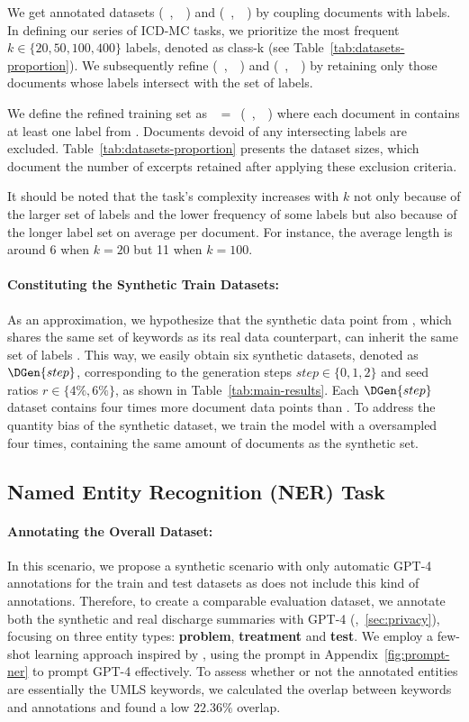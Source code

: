 We get annotated datasets (~\dtr,~\ltr~) and (~\dte,~\lte~) by coupling documents with labels. In defining our series of ICD-MC tasks, we prioritize the most frequent $k \in \{20,50,100,400\}$ labels, denoted as class-k (see Table~\ref{tab:datasets-proportion}). We subsequently refine  (~\dtr,~\ltr~) and (~\dte,~\lte~) by retaining only those documents whose labels intersect with the set of  labels.

We define the refined training set as \dgold~$=$~(~\dptr,~\lptr~) where each document in \dptr contains at least one label from . Documents devoid of any intersecting labels are excluded. Table~\ref{tab:datasets-proportion} presents the dataset sizes, which document the number of excerpts retained after applying these exclusion criteria.

It should be noted that the task's complexity increases with $k$ not only because of the larger set of labels and the lower frequency of some labels but also because of the longer label set on average per document. For instance, the average length is around 6 when $k=20$ but 11 when $k=100$.

\paragraph{Constituting the Synthetic Train Datasets: }
As an approximation, we hypothesize that the synthetic data point from \dgstar, which shares the same set of keywords \kgen as its real data counterpart, can inherit the same set of labels \lptr. This way, we easily obtain six synthetic datasets, denoted as $\DGen{step}$, corresponding to the generation steps $step \in \{0,1,2\}$ and seed ratios $r \in \{4\%,6\%\}$, as shown in Table~\ref{tab:main-results}. Each $\DGen{step}$ dataset contains four times more document data points than \dgold. To address the quantity bias of the synthetic dataset, we train the model with a \dgold oversampled four times, \dgover containing the same amount of documents as the synthetic set.

\subsection{Named Entity Recognition (NER) Task}
\paragraph{Annotating the Overall Dataset:}
In this scenario, we propose a synthetic scenario with only automatic GPT-4 annotations for the train and test datasets as \mimic does not include this kind of annotations.
Therefore, to create a comparable evaluation dataset, we annotate both the synthetic and real discharge summaries with GPT-4 (\citet{openai_gpt-4_2023},~\ref{sec:privacy}), focusing on three entity types: \textbf{problem}, \textbf{treatment} and \textbf{test}. We employ a few-shot learning approach inspired by \citet{hu_improving_2024}, using the prompt in Appendix~\ref{fig:prompt-ner} to prompt GPT-4 effectively. To assess whether or not the annotated entities are essentially the UMLS keywords, we calculated the overlap between keywords and annotations and found a low $22.36\%$ overlap.


